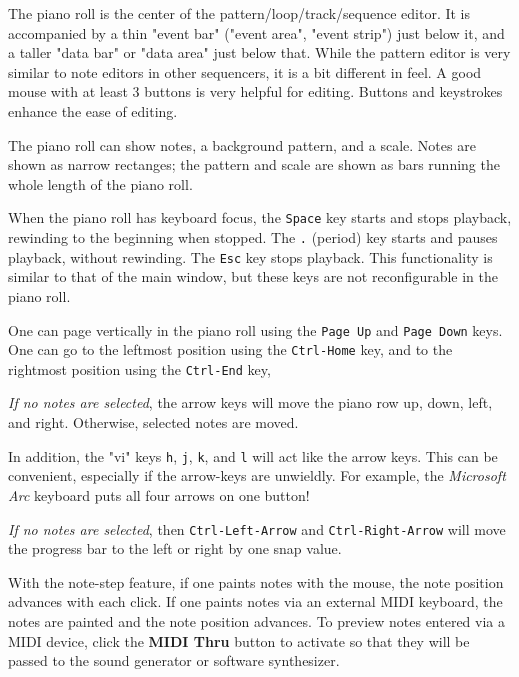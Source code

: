    The piano roll is the center of the pattern/loop/track/sequence editor.
   It is accompanied by a thin "event bar" ("event area", "event strip")
   just below it,
   and a taller "data bar" or "data area" just below that.
   While the pattern
   editor is very similar to note editors in other sequencers, it is a bit
   different in feel.  A good mouse with at least 3 buttons is very helpful
   for editing.  Buttons and keystrokes enhance the ease of editing.

   The piano roll can show notes, a background pattern, and a scale.
   Notes are shown as narrow rectanges; the pattern and scale are
   shown as bars running the whole length of the piano roll.

   When the piano roll has keyboard focus, the \texttt{Space} key
   starts and stops playback, rewinding to the beginning when stopped.
   The \texttt{.} (period) key starts and pauses playback, without
   rewinding.
   The \texttt{Esc} key stops playback.
   This functionality is similar to that of the main window, but
   these keys are not reconfigurable in the piano roll.

   One can page vertically in the piano roll using the
    \texttt{Page Up} and 
    \texttt{Page Down} keys.
   One can go to the leftmost position using the 
    \texttt{Ctrl-Home} key,
   and to the rightmost position using the
    \texttt{Ctrl-End} key,

   \textsl{If no notes are selected}, the arrow keys will move the piano row
   up, down, left, and right.
   Otherwise, selected notes are moved.

   In addition, the "vi" keys \texttt{h}, \texttt{j}, \texttt{k}, and
   \texttt{l} will act like the arrow keys. This can be convenient, especially
   if the arrow-keys are unwieldly.  For example, the
   \textsl{Microsoft Arc} keyboard puts all four arrows on one button!

   \textsl{If no notes are selected}, then \texttt{Ctrl-Left-Arrow}
   and \texttt{Ctrl-Right-Arrow} will move the progress bar to the left or
   right by one snap value.

   With the note-step feature, if one paints notes with the mouse,
   the note position advances with each click.
   If one paints notes via an external MIDI keyboard, the notes are painted and
   the note position advances.
   To preview notes entered via a MIDI device, click the
   \textbf{MIDI Thru} button to activate so that they will be
   passed to the sound generator or software synthesizer.

